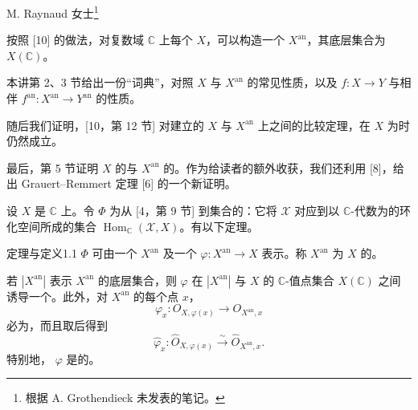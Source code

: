 \begin{center}M. Raynaud 女士\footnote{根据 A. Grothendieck 未发表的笔记。}\end{center}
按照 [10] 的做法，对复数域 $\mathbb C$ 上每个 $X$，可以构造一个 $X^{\mathrm{an}}$，其底层集合为 $X(\mathbb C)$。

本讲第 2、3 节给出一份“词典”，对照 $X$ 与 $X^{\mathrm{an}}$ 的常见性质，以及 $f:X\to Y$ 与相伴 $f^{\mathrm{an}}:X^{\mathrm{an}}\to Y^{\mathrm{an}}$ 的性质。

随后我们证明，[10，第 12 节] 对建立的 $X$ 与 $X^{\mathrm{an}}$ 上之间的比较定理，在 $X$ 为时仍然成立。

最后，第 5 节证明 $X$ 的与 $X^{\mathrm{an}}$ 的。作为给读者的额外收获，我们还利用 [8]，给出 Grauert–Remmert 定理 [6] 的一个新证明。

设 $X$ 是 $\mathbb C$ 上。令 $\Phi$ 为从 [4，第 9 节] 到集合的：它将 $\mathcal X$ 对应到以 $\mathbb C$-代数为的环化空间所成的集合 $\operatorname{Hom}_{\mathbb C}(\mathcal X,X)$。有以下定理。

\begin{SGAresult}{定理与定义}{1.1}
 $\Phi$ 可由一个 $X^{\mathrm{an}}$ 及一个 $\varphi:X^{\mathrm{an}}\to X$ 表示。称 $X^{\mathrm{an}}$ 为 $X$ 的。

若 $|X^{\mathrm{an}}|$ 表示 $X^{\mathrm{an}}$ 的底层集合，则 $\varphi$ 在 $|X^{\mathrm{an}}|$ 与 $X$ 的 $\mathbb C$-值点集合 $X(\mathbb C)$ 之间诱导一个。此外，对 $X^{\mathrm{an}}$ 的每个点 $x$，
\[
\varphi_x:O_{X,\varphi(x)}\longrightarrow O_{X^{\mathrm{an}},x}
\]
必为，而且取后得到
\[
\widehat\varphi_x:\widehat O_{X,\varphi(x)}\xrightarrow{\sim}\widehat O_{X^{\mathrm{an}},x}.
\]
特别地， $\varphi$ 是的。
\end{SGAresult}

